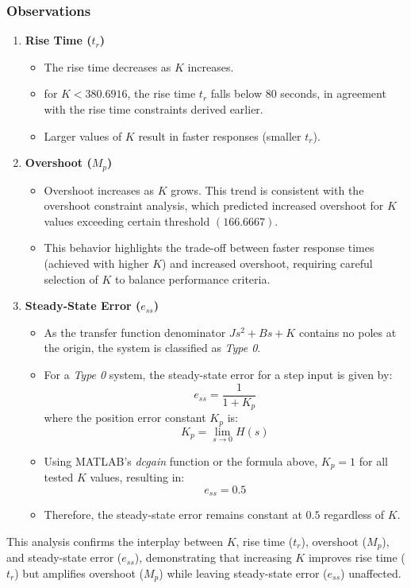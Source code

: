 \documentclass[a4paper, 12pt, english]{article}
\begin{document}
\subsubsection*{Observations}
\begin{enumerate}
    \item \textbf{Rise Time ($ {{t}_{r}} $)}
    \begin{itemize}
        \item The rise time decreases as $K$ increases.
        \item for $K < 380.6916 $, the rise time $ {{t}_{r}} $ falls below $80$ seconds, in agreement with the rise time constraints derived earlier.
        \item Larger values of $K$ result in faster responses (smaller $ {{t}_{r}} $).
    \end{itemize}

    \item \textbf{Overshoot ($ {{M}_{p}} $)}
    \begin{itemize}
        \item Overshoot increases as $K$ grows. This trend is consistent with the overshoot constraint analysis, which predicted increased overshoot for $K$ values exceeding certain threshold $\left( 166.6667 \right)$.
        \item This behavior highlights the trade-off between faster response times (achieved with higher $K$) and increased overshoot, requiring careful selection of $K$ to balance performance criteria.
    \end{itemize}

    \item \textbf{Steady-State Error ($ {{e}_{ss}} $)}
    \begin{itemize}
        \item As the transfer function denominator $ {J}{{s}^{2}} + {B}{s} + {K} $ contains no poles at the origin, the system is classified as \textit{Type 0}.
        \item For a \textit{Type 0} system, the steady-state error for a step input is given by:
        \[ {{e}_{ss}} = {\frac{1}{{1} + {{K}_{p}}}} \]
        where the position error constant $ {{K}_{p}} $ is:
        \[ {{K}_{p}} = {\lim_{{s}\to{0}} {H}\left({s}\right)} \]
        \item Using MATLAB’s \textit{dcgain} function or the formula above, $ {{K}_{p}} = {1} $ for all tested $K$ values, resulting in:
        \[ {{e}_{ss}} = {0.5} \]
        \item Therefore, the steady-state error remains constant at $0.5$ regardless of $K$.
    \end{itemize}
\end{enumerate}
This analysis confirms the interplay between $K$, rise time ($ {{t}_{r}} $), overshoot ($ {{M}_{p}} $), and steady-state error ($ {{e}_{ss}} $), demonstrating that increasing $K$ improves  rise time ($ {{t}_{r}} $) but amplifies overshoot ($ {{M}_{p}} $) while leaving steady-state error ($ {{e}_{ss}} $) unaffected.
\end{document}
